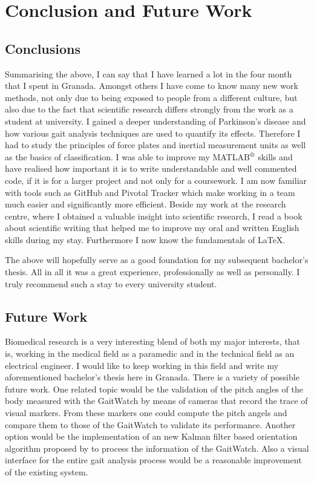 \chapter{Conclusion and Future Work}
\label{ch:Conclusion and Future Work}

\section{Conclusions}

Summarising the above, I can say that I have learned a lot in the four month that I spent in Granada. Amongst others I have come to know many new work methods, not only due to being exposed to people from a different culture, but also due to the fact that scientific research differs strongly from the work as a student at university. I gained a deeper understanding of Parkinson's disease and how various gait analysis techniques are used to quantify its effects. Therefore I had to study the principles of force plates and inertial measurement units as well as the basics of classification. I was able to improve my MATLAB$\textsuperscript{\textregistered}$ skills and have realised how important it is to write understandable and well commented code, if it is for a larger project and not only for a coursework. I am now familiar with tools such as GitHub and Pivotal Tracker which make working in a team much easier and significantly more efficient.  Beside my work at the research centre, where I obtained a valuable insight into scientific research, I read a book about scientific writing that helped me to improve my oral and written English skills during my stay. Furthermore I now know the fundamentals of \LaTeX{}.

The above will hopefully serve as a good foundation for my subsequent bachelor's thesis.  All in all it was a great experience, professionally as well as personally. I truly recommend such a stay to every university student.

\section{Future Work}

Biomedical research is a very interesting blend of both my major interests, that is, working in the medical field as a paramedic and  in the technical field as an electrical engineer. I would like to keep working in this field and write my aforementioned bachelor's thesis here in Granada. There is a variety of possible future work. One related topic would be the validation of the pitch angles of the body measured with the GaitWatch by means of cameras that record the trace of visual markers. From these markers one could compute the pitch angels and compare them to those of the GaitWatch to validate its performance. Another option would be the implementation of an new Kalman filter based orientation algorithm proposed by \cite{} to process the information of the GaitWatch. Also a visual interface for the entire gait analysis process would be a reasonable improvement of the existing system.